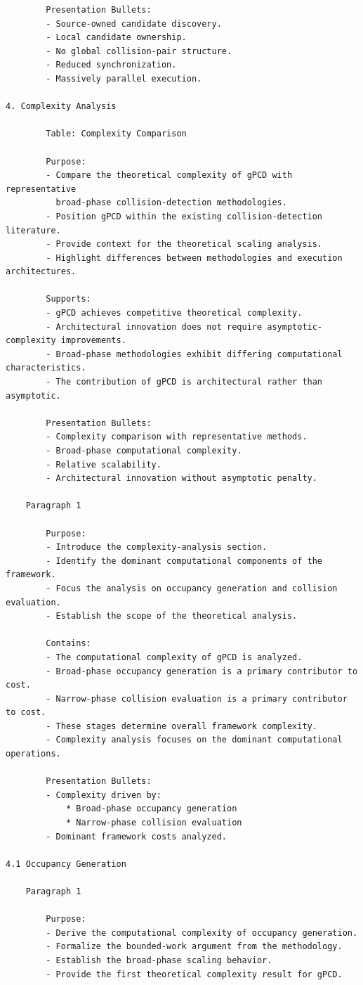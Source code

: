\begin{verbatim}
		Presentation Bullets:
		- Source-owned candidate discovery.
		- Local candidate ownership.
		- No global collision-pair structure.
		- Reduced synchronization.
		- Massively parallel execution.

4. Complexity Analysis

		Table: Complexity Comparison

		Purpose:
		- Compare the theoretical complexity of gPCD with representative
		  broad-phase collision-detection methodologies.
		- Position gPCD within the existing collision-detection literature.
		- Provide context for the theoretical scaling analysis.
		- Highlight differences between methodologies and execution architectures.

		Supports:
		- gPCD achieves competitive theoretical complexity.
		- Architectural innovation does not require asymptotic-complexity improvements.
		- Broad-phase methodologies exhibit differing computational characteristics.
		- The contribution of gPCD is architectural rather than asymptotic.

		Presentation Bullets:
		- Complexity comparison with representative methods.
		- Broad-phase computational complexity.
		- Relative scalability.
		- Architectural innovation without asymptotic penalty.

	Paragraph 1

		Purpose:
		- Introduce the complexity-analysis section.
		- Identify the dominant computational components of the framework.
		- Focus the analysis on occupancy generation and collision evaluation.
		- Establish the scope of the theoretical analysis.

		Contains:
		- The computational complexity of gPCD is analyzed.
		- Broad-phase occupancy generation is a primary contributor to cost.
		- Narrow-phase collision evaluation is a primary contributor to cost.
		- These stages determine overall framework complexity.
		- Complexity analysis focuses on the dominant computational operations.

		Presentation Bullets:
		- Complexity driven by:
			* Broad-phase occupancy generation
			* Narrow-phase collision evaluation
		- Dominant framework costs analyzed.

4.1 Occupancy Generation

	Paragraph 1

		Purpose:
		- Derive the computational complexity of occupancy generation.
		- Formalize the bounded-work argument from the methodology.
		- Establish the broad-phase scaling behavior.
		- Provide the first theoretical complexity result for gPCD.


\end{verbatim}
